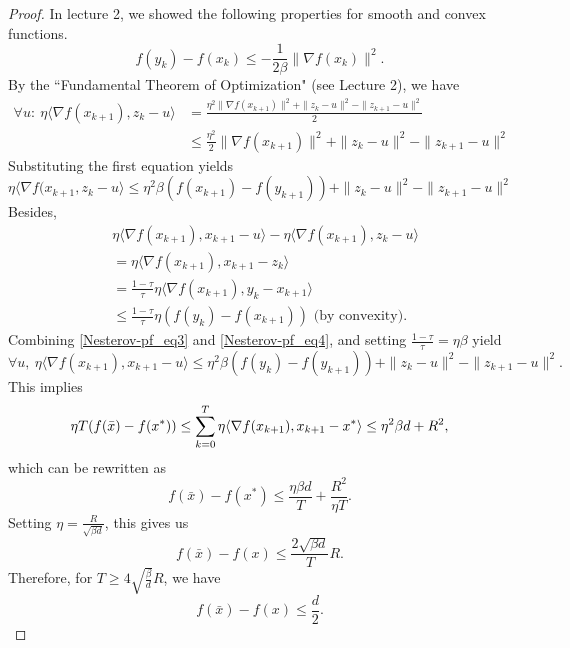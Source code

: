 \begin{proof}
In lecture 2, we showed the following properties for smooth and convex functions.
\begin{equation}
f(y_k) - f(x_k) \leq -\frac{1}{2 \beta} \|\nabla f(x_k) \|^2. \label{Nesterov-pf_smoothness_and_convexity}
\end{equation}
By the ``Fundamental Theorem of Optimization" (see Lecture 2), we have
\begin{align}
\forall u: \ \eta  \langle \nabla f(x_{k+1}), z_k - u \rangle &= \frac{\eta^2 \|\nabla f(x_{k+1})\|^2 + \|z_k - u \|^2 - \|z_{k+1} - u \|^2}{2} \\
&\leq \frac{\eta^2}{2} \|\nabla f(x_{k+1})\|^2 + \|z_k - u \|^2 - \|z_{k+1} - u \|^2
\end{align}
Substituting the first equation yields
\begin{equation}
\eta \langle \nabla f(x_{k+1}, z_k - u \rangle \leq \eta^2 \beta (f(x_{k+1}) - f(y_{k+1})) + \|z_k - u\|^2 - \|z_{k+1} - u \|^2 \label{Nesterov-pf_eq3}
\end{equation}
\medskip
Besides,
\begin{align}
&\eta \langle \nabla f(x_{k+1}), x_{k+1} - u\rangle - \eta \langle \nabla f(x_{k+1}), z_k - u\rangle \nonumber\\
&= \eta \langle\nabla f(x_{k+1}), x_{k+1} - z_k\rangle \nonumber\\
&= \frac{1-\tau}{\tau}  \eta \langle\nabla f(x_{k+1}), y_k - x_{k+1}\rangle \nonumber\\
&\leq \frac{1-\tau}{\tau} \eta (f(y_k) - f(x_{k+1})) \text{ (by convexity)}. \label{Nesterov-pf_eq4}
\end{align}
\medskip
Combining  \eqref{Nesterov-pf_eq3} and \eqref{Nesterov-pf_eq4}, and setting $\frac{1-\tau}{\tau} = \eta \beta$ yield
\begin{equation*}
\forall u,\ \eta \langle\nabla f(x_{k+1}), x_{k+1} - u\rangle \leq \eta^2 \beta (f(y_k) - f(y_{k+1})) + \|z_k - u\|^2 - \|z_{k+1} - u\|^2.
\end{equation*}
This implies
\begin{equation*}
\eta T (f(\bar{x}) - f(x^*)) \leq \sum_{k=0}^T \eta \langle\nabla f(x_{k+1}), x_{k+1} - x^*\rangle\\
\leq \eta^2 \beta d + R^2,
\end{equation*}
which can be rewritten as
\begin{equation*}
f(\bar{x}) - f(x^*) \leq \frac{\eta \beta d}{T} + \frac{R^2}{\eta T}.
\end{equation*}
Setting $\eta = \frac{R}{\sqrt{\beta d}}$, this gives us
\begin{equation*}
f(\bar{x}) - f(x) \leq \frac{2 \sqrt{\beta d}}{T} R.
\end{equation*}
Therefore, for $T \geq 4 \sqrt{\frac{\beta}{d}} R$, we have
\begin{equation*}
f(\bar{x}) - f(x) \leq \frac{d}{2}.
\end{equation*}
\end{proof}

